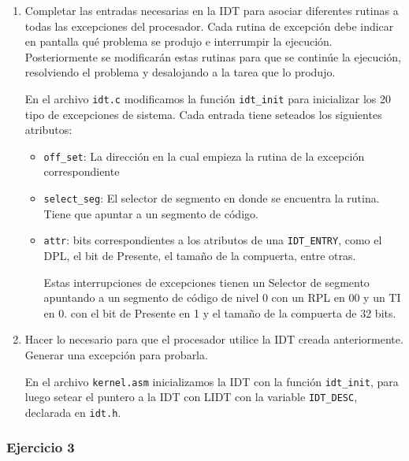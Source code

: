\documentclass[a4paper]{article}
\begin{document}
\begin{enumerate}[label=\alph*)]
	\item Completar las entradas necesarias en la IDT para asociar diferentes rutinas a todas las excepciones del procesador. Cada rutina de excepción debe indicar en pantalla qué problema se produjo e interrumpir la ejecución. Posteriormente se modificarán estas rutinas para que se continúe la ejecución, resolviendo el problema y desalojando a la tarea que lo produjo.
	
	En el archivo \texttt{idt.c} modificamos la funci\'on \texttt{idt\_init} para inicializar los 20 tipo de excepciones de sistema. Cada entrada tiene seteados los siguientes atributos:
	
	\begin{itemize}
		\item \texttt{off\_set}: La direcci\'on en la cual empieza la rutina de la excepci\'on correspondiente
		\item \texttt{select\_seg}: El selector de segmento en donde se encuentra la rutina. Tiene que apuntar a un segmento de c\'odigo.
		\item \texttt{attr}: bits correspondientes a los atributos de una \texttt{IDT\_ENTRY}, como el DPL, el bit de Presente, el tama\~no de la compuerta, entre otras. 
		
		Estas interrupciones de excepciones tienen un Selector de segmento apuntando a un segmento de c\'odigo de nivel 0 con un RPL en 00 y un TI en 0. con el bit de Presente en 1 y el tama\~no de la compuerta de 32 bits.
	\end{itemize}
	
	\item Hacer lo necesario para que el procesador utilice la IDT creada anteriormente. Generar una excepción para probarla.
	
	En el archivo \texttt{kernel.asm} inicializamos la IDT con la funci\'on \texttt{idt\_init}, para luego setear el puntero a la IDT con LIDT con la variable \texttt{IDT\_DESC}, declarada en \texttt{idt.h}.
	
\end{enumerate}

 \subsubsection{Ejercicio 3}
 
\end{document}
